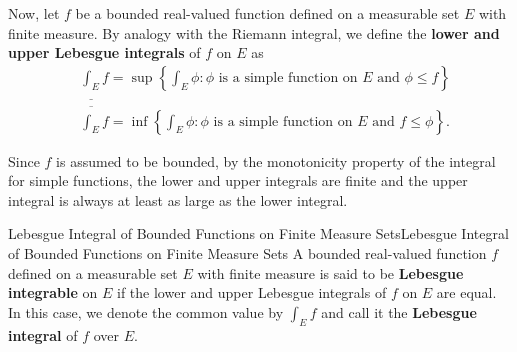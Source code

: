 \documentclass[../main.tex]{subfiles}
\begin{document}
Now, let $f$ be a bounded real-valued function defined on a measurable set $E$ with finite measure. By analogy with the Riemann integral, we define the \textbf{lower and upper Lebesgue integrals} of $f$ on $E$ as
\begin{equation}
	\begin{aligned}
		 & \underline{\int_E} f = \sup \left\{ \int_E \phi : \phi \text{ is a simple function on } E \text{ and } \phi \leq f \right\} \\
		 & \overline{\int_E} f = \inf \left\{ \int_E \phi : \phi \text{ is a simple function on } E \text{ and } f \leq \phi \right\}.
	\end{aligned}
\end{equation}

Since $f$ is assumed to be bounded, by the monotonicity property of the integral for simple functions, the lower and upper integrals are finite and the upper integral is always at least as large as the lower integral.

\begin{definition}{Lebesgue Integral of Bounded Functions on Finite Measure Sets}{Lebesgue Integral of Bounded Functions on Finite Measure Sets}
	A bounded real-valued function $f$ defined on a measurable set $E$ with finite measure is said to be \textbf{Lebesgue integrable} on $E$ if the lower and upper Lebesgue integrals of $f$ on $E$ are equal. In this case, we denote the common value by $\int_E f$ and call it the \textbf{Lebesgue integral} of $f$ over $E$.
\end{definition}
\end{document}
